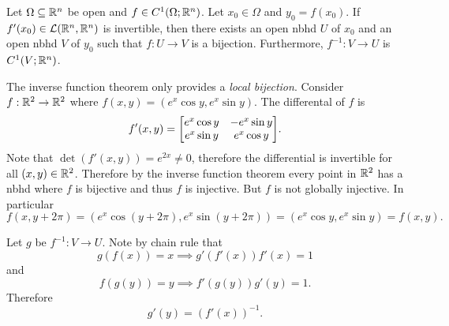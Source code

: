 \documentclass[../main.tex]{subfiles}
\begin{document}
\begin{theorem}
    \label{thm:inversefunctionthm}
    Let $\Omega \subseteq \mathbb{R}^n$ be open and $f \in C^1(\Omega; \mathbb{R}^n)$. Let $x_0 \in \Omega$ and $y_0 = f(x_0)$. If $f'(x_0) \in \mathcal{L}(\mathbb{R}^n, \mathbb{R}^n)$ is invertible, then there exists an open nbhd $U$ of $x_0$ and an open nbhd $V$ of $y_0$ such that $f : U \to V$ is a bijection. Furthermore, $f^{-1} : V \to U$ is $C^1(V; \mathbb{R}^n)$.
\end{theorem}

\begin{remark}
    The inverse function theorem only provides a \emph{local bijection}. Consider $f : \mathbb{R}^2 \to \mathbb{R}^2$ where $f(x,y) = (e^{x} \cos y, e^{x} \sin y)$. The differental of $f$ is
    \[
        f'(x,y) = \mqty[
            e^{x} \cos y & -e^{x} \sin y \\
            e^{x} \sin y & e^{x} \cos y
        ]
    .\]
    Note that $\det(f'(x,y)) = e^{2x} \neq 0$, therefore the differential is invertible for all $(x,y) \in \mathbb{R}^2$. Therefore by the inverse function theorem every point in $\mathbb{R}^2$ has a nbhd where $f$ is bijective and thus $f$ is injective. But $f$ is not globally injective. In particular
    \[
        f(x, y + 2 \pi) = (e^{x} \cos (y + 2 \pi), e^{x} \sin (y + 2 \pi))  = (e^{x} \cos y, e^{x} \sin y) = f(x,y)
    .\]

    Let $g$ be $f^{-1} : V \to U$. Note by chain rule that
    \[
        g(f(x)) = x \implies g'(f'(x)) f'(x) = 1
    \]
    and
    \[
        f(g(y)) = y \implies f'(g(y)) g'(y) = 1
    .\]
    Therefore
    \[
        g'(y) = (f'(x))^{-1}
    .\]
\end{remark}
\end{document}
